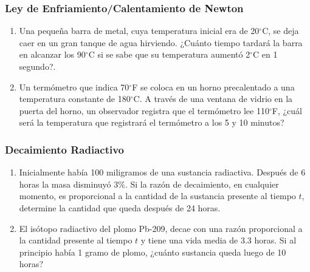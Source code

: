 \subsubsection{Ley de Enfriamiento/Calentamiento de Newton}

\begin{enumerate}
	\item Una pequeña barra de metal, cuya temperatura inicial era de 20\ensuremath{^\circ}C, se deja caer en un gran tanque de agua 
	    hirviendo. ¿Cuánto tiempo tardará la barra en alcanzar los 90\ensuremath{^\circ}C si se sabe que su temperatura aumentó 
	    2\ensuremath{^\circ}C en 1 segundo?.
	\item Un termómetro que indica 70\ensuremath{^\circ}F se coloca en un horno precalentado a una temperatura constante de 
	    180\ensuremath{^\circ}C. A través de una ventana de vidrio en la puerta del horno, un observador registra que el termómetro lee
	    110\ensuremath{^\circ}F, ¿cuál será la temperatura que registrará el termómetro a los 5 y 10 minutos?
\end{enumerate}

\subsubsection{Decaimiento Radiactivo}

\begin{enumerate}
	\item Inicialmente había 100 miligramos de una sustancia radiactiva. Después de 6 horas la masa disminuyó 3\%. Si la razón de 
	    decaimiento, en cualquier momento, es proporcional a la cantidad de la sustancia presente al tiempo $t$, determine la cantidad 
	    que queda después de 24 horas. 
	\item El isótopo radiactivo del plomo Pb-209, decae con una razón proporcional a la cantidad presente al tiempo $t$ y tiene una 
	    vida media de 3.3 horas. Si al principio había 1 gramo de plomo, ¿cuánto sustancia queda luego de 10 horas?
\end{enumerate}
